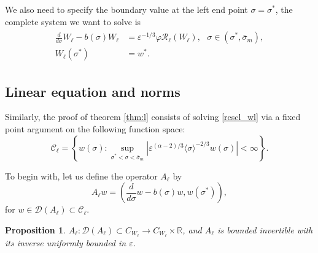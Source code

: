 \documentclass[letterpaper,11pt]{article}
\newcommand{\Ral}{\mathcal{R}}
\newcommand{\eps}{\varepsilon}
\numberwithin{equation}{section}
\theoremstyle{plain}
\newtheorem{proposition}[theorem]{Proposition}
\begin{document}
We also need to specify the boundary value at the left end point $\sigma = \sigma^*$, the complete system we want to solve is
\begin{align}\label{wl_bp}
\begin{split}
\frac{d}{d\sigma} W_\ell - b(\sigma)W_\ell &= \eps^{-1/3}\varphi \Ral_\ell(W_\ell), \text{ }\sigma \in (\sigma^*, \bar{\sigma}_m),\\
W_\ell(\sigma^*) &= w^*.
\end{split}
\end{align}

\subsection{Linear equation and norms}

Similarly, the proof of theorem \ref{thm:l} consists of solving \eqref{rescl_wl} via a fixed point argument on the following function space:
\[
\mathcal{C}_{\ell} = \left\{ w(\sigma) : \sup_{\sigma^*<\sigma<\bar{\sigma}_m} |\eps^{(\alpha-2)/3}\langle\sigma \rangle^{-2/3} w(\sigma)|<\infty \right\}.
\]


To begin with, let us define the operator $A_\ell$ by 
\[
A_\ell w = \left(\frac{d}{d\sigma}w - b(\sigma)w, w(\sigma^*)\right),
\] 
for $w \in \mathcal{D}(A_\ell) \subset \mathcal{C}_\ell.$

\begin{proposition} \label{inv_A_l}
$A_\ell : \mathcal{D}(A_\ell) \subset C_{W_\ell} \to C_{W_\ell} \times \mathbb{R}$, and $A_\ell$ is bounded invertible with its inverse uniformly bounded in $\eps$.
\end{proposition}
\end{document}
